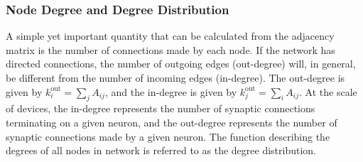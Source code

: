\subsubsection{Node Degree and Degree Distribution}
A simple yet important quantity that can be calculated from the adjacency matrix is the number of connections made by each node. If the network has directed connections, the number of outgoing edges (out-degree) will, in general, be different from the number of incoming edges (in-degree). The out-degree is given by $k^{\mathrm{out}}_i = \sum_jA_{ij}$, and the in-degree is given by $k^{\mathrm{out}}_j = \sum_iA_{ij}$. At the scale of devices, the in-degree represents the number of synaptic connections terminating on a given neuron, and the out-degree represents the number of synaptic connections made by a given neuron. The function describing the degrees of all nodes in network is referred to as the degree distribution.


